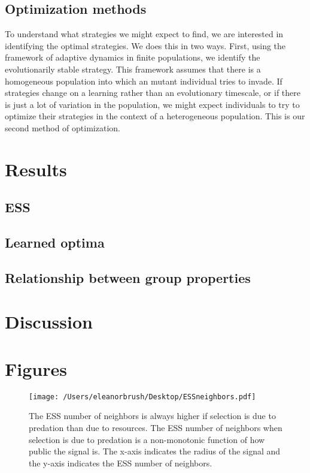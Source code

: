 \documentclass{article}
\begin{document}
\subsection{Optimization methods }
To understand what strategies we might expect to find, we are interested in identifying the optimal strategies.  We does this in two ways.  First, using the framework of adaptive dynamics in finite populations, we identify the evolutionarily stable strategy.  This framework assumes that there is a homogeneous population into which an mutant individual tries to invade.  If strategies change on a learning rather than an evolutionary timescale, or if there is just a lot of variation in the population, we might expect individuals to try to optimize their strategies in the context of a heterogeneous population.  This is our second method of optimization.

\section{Results }

\subsection{ESS }
\subsection{Learned optima }
\subsection{Relationship between group properties }

\section{Discussion}

\section{Figures }
\begin{figure}[ht]
\texttt{[image: /Users/eleanorbrush/Desktop/ESSneighbors.pdf]}
\caption{\label{ESS} The ESS number of neighbors is always higher if selection is due to predation than due to resources.  The ESS number of neighbors when selection is due to predation is a non-monotonic function of how public the signal is. The x-axis indicates the radius of the signal and the y-axis indicates the ESS number of neighbors. 
}
\end{figure}
\end{document}
